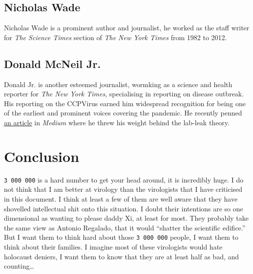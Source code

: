 \documentclass[11pt]{article}
\begin{document}
\subsection{Nicholas Wade}
\label{sec:org4b16d0c}
Nicholas Wade is a prominent author and journalist, he worked as the staff writer for \emph{The Science Times} section of \emph{The New York Times} from 1982 to 2012.
\subsection{Donald McNeil Jr.}
\label{sec:orgcca5555}
Donald Jr. is another esteemed journalist, wormking as a science and health reporter for \emph{The New York Times}, specialising in reporting on disease outbreak. His reporting on the CCPVirus earned him widespread recognition for being one of the earliest and prominent voices covering the pandemic. He recently penned \href{https://donaldgmcneiljr1954.medium.com/how-i-learned-to-stop-worrying-and-love-the-lab-leak-theory-f4f88446b04d}{an article} in \emph{Medium} where he threw his weight behind the lab-leak theory.

\section{Conclusion}
\label{sec:org9549b23}
\texttt{3 000 000} is a hard number to get your head around, it is incredibly huge. I do not think that I am better at virology than the virologists that I have criticised in this document. I think at least a few of them are well aware that they have shovelled intellectual shit onto this situation. I doubt their intentions are so one dimensional as wanting to please daddy Xi, at least for most. They probably take the same view as Antonio Regalado, that it would ``shatter the scientific edifice.'' But I want them to think hard about those \texttt{3 000 000} people, I want them to think about their families. I imagine most of these virologists would hate holocaust deniers, I want them to know that they are at least half as bad, and counting\ldots{}
\end{document}
